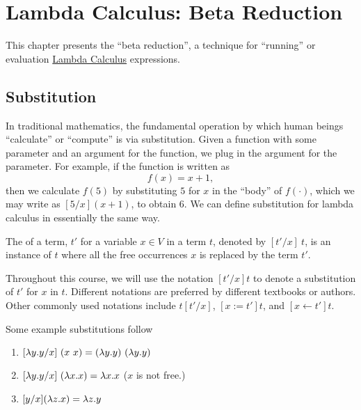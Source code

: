 \chapter{Lambda Calculus: Beta Reduction}
\label{ch:lambda}

\begin{preamble}
This chapter presents the ``beta reduction'', a technique for ``running'' or evaluation \href{ch:lcs}{Lambda Calculus} expressions.
\end{preamble}

\section{Substitution}
\label{sec:lcsb::sub}

In traditional mathematics, the fundamental operation by which human beings ``calculate'' or ``compute'' is via substitution.
%
Given a function with some parameter and an argument for the function, we plug in the argument for the parameter.
%
For example, if the function is written as 
\[
f(x) = x + 1,
\]  
then we calculate $f(5)$ by substituting $5$ for $x$ in the ``body'' of $f(\cdot)$, which we may write as $[5/x](x+1)$, to obtain $6$.
%
We can define substitution for lambda calculus in essentially the same
way.

\begin{definition}[Substitution]
\label{def:lcsb::basic}
The  of a term, $t'$ for a variable $x \in V$ in a term
$t$, denoted by $[t'/x]~t$, is an instance of $t$ where all the free
occurrences $x$ is replaced by the term $t'$.
\end{definition}

Throughout this course, we will use the notation $[t'/x]t$ to denote a
substitution of $t'$ for $x$ in $t$.  Different notations are
preferred by different textbooks or authors. Other commonly used
notations include $t[t'/x]$, $[x:=t']t$, and  $[x \leftarrow t']t$.  

\begin{example}
\label{xmpl:lcsb::basic}
Some example substitutions follow
\begin{enumerate}
\item $[\lambda y.y/x]~(x~x)= (\lambda y.y)~(\lambda y.y)$

\item $[\lambda y.y/x]~(\lambda x.x) = \lambda x.x$ ($x$ is not free.)

\item $[y/x](\lambda z.x) = \lambda z.y$

\end{enumerate}
\end{example}

